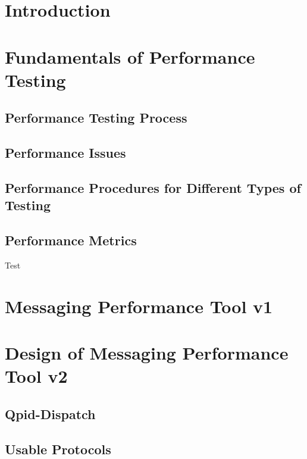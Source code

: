 
\chapter{Introduction}

\chapter{Fundamentals of Performance Testing}

\section{Performance Testing Process}

\section{Performance Issues}

\section{Performance Procedures for Different Types of Testing}

\section{Performance Metrics}
Test \cite{Kurkova:Thesis:2017}

\chapter{Messaging Performance Tool v1}

\chapter{Design of Messaging Performance Tool v2}

\section{Qpid-Dispatch}

\section{Usable Protocols}

